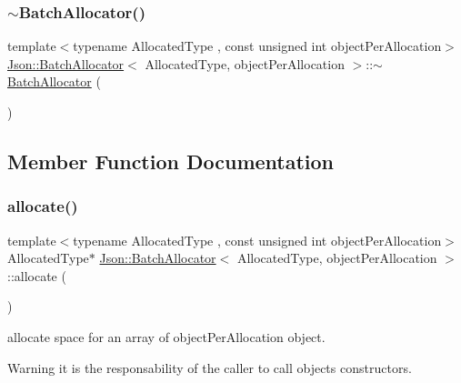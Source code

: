 \mbox{\label{class_json_1_1_batch_allocator_a823a98097ec40ccc8d88da9378be228d}} 
\subsubsection{\texorpdfstring{$\sim$\+Batch\+Allocator()}{~BatchAllocator()}}
{\footnotesize\ttfamily template$<$typename Allocated\+Type , const unsigned int object\+Per\+Allocation$>$ \\
\mbox{\hyperlink{class_json_1_1_batch_allocator}{Json\+::\+Batch\+Allocator}}$<$ Allocated\+Type, object\+Per\+Allocation $>$\+::$\sim$\mbox{\hyperlink{class_json_1_1_batch_allocator}{Batch\+Allocator}} (\begin{DoxyParamCaption}{ }\end{DoxyParamCaption})\hspace{0.3cm}{\ttfamily [inline]}}



\subsection{Member Function Documentation}
\mbox{\label{class_json_1_1_batch_allocator_a4909756c2d33bd0f07662e88e4f850dd}} 
\subsubsection{\texorpdfstring{allocate()}{allocate()}}
{\footnotesize\ttfamily template$<$typename Allocated\+Type , const unsigned int object\+Per\+Allocation$>$ \\
Allocated\+Type$\ast$ \mbox{\hyperlink{class_json_1_1_batch_allocator}{Json\+::\+Batch\+Allocator}}$<$ Allocated\+Type, object\+Per\+Allocation $>$\+::allocate (\begin{DoxyParamCaption}{ }\end{DoxyParamCaption})\hspace{0.3cm}{\ttfamily [inline]}}

allocate space for an array of object\+Per\+Allocation object. \begin{DoxyWarning}{Warning}
it is the responsability of the caller to call objects constructors. 
\end{DoxyWarning}
\mbox{\label{class_json_1_1_batch_allocator_aceb116aceb6bb5bbcfd05433abc04ba5}} 
